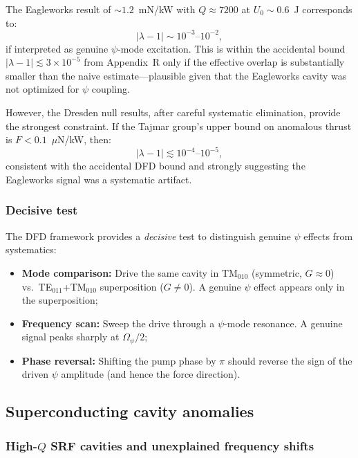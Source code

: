 \documentclass[12pt,aps,prd,twocolumn,superscriptaddress,nofootinbib]{revtex4-2}
\newcommand{\Opsi}{\Omega_\psi}
\begin{document}
The Eagleworks result of $\sim 1.2$~mN/kW with $Q \approx 7200$ at
$U_0 \sim 0.6$~J corresponds to:
\begin{equation}
  |\lambda - 1| \sim 10^{-3}\text{--}10^{-2},
  \label{eq:emdrive_lambda}
\end{equation}
if interpreted as genuine $\psi$-mode excitation.  This is within the
accidental bound $|\lambda - 1| \lesssim 3\times 10^{-5}$ from
Appendix~R only if the effective overlap is substantially smaller than
the naive estimate---plausible given that the Eagleworks cavity was not
optimized for $\psi$ coupling.

However, the Dresden null results, after careful systematic elimination,
provide the strongest constraint.  If the Tajmar group's
upper bound on anomalous thrust is $F < 0.1$~$\mu$N/kW, then:
\begin{equation}
  |\lambda - 1| \lesssim 10^{-4}\text{--}10^{-5},
  \label{eq:dresden_bound}
\end{equation}
consistent with the accidental DFD bound and strongly suggesting the
Eagleworks signal was a systematic artifact.

\subsubsection{Decisive test}

The DFD framework provides a \emph{decisive} test to distinguish genuine
$\psi$ effects from systematics:
\begin{itemize}[noitemsep]
  \item \textbf{Mode comparison:} Drive the same cavity in TM$_{010}$
    (symmetric, $G \approx 0$) vs.\ TE$_{011}$+TM$_{010}$ superposition
    ($G \neq 0$).  A genuine $\psi$ effect appears only in the
    superposition;
  \item \textbf{Frequency scan:} Sweep the drive through a $\psi$-mode
    resonance.  A genuine signal peaks sharply at $\Opsi/2$;
  \item \textbf{Phase reversal:} Shifting the pump phase by $\pi$ should
    reverse the sign of the driven $\psi$ amplitude (and hence the
    force direction).
\end{itemize}

\subsection{Superconducting cavity anomalies}
\label{sec:SRF}

\subsubsection{High-$Q$ SRF cavities and unexplained frequency shifts}
\end{document}
